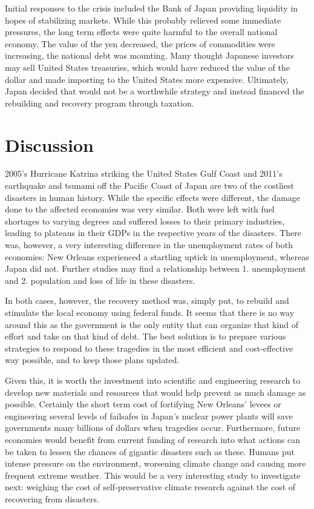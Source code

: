 \documentclass[%
 reprint,
 amsmath,amssymb,
 aps,
]{revtex4-1}
\begin{document}
Initial responses to the crisis included the Bank of Japan providing liquidity in hopes of stabilizing markets. While this probably relieved some immediate pressures, the long term effects were quite harmful to the overall national economy. The value of the yen decreased, the prices of commodities were increasing, the national debt was mounting. Many thought Japanese investors may sell United States treasuries, which would have reduced the value of the dollar and made importing to the United States more expensive. Ultimately, Japan decided that would not be a worthwhile strategy and instead financed the rebuilding and recovery program through taxation. \cite{amadeo_2020}

\section{\label{sec:level1}Discussion}

2005's Hurricane Katrina striking the United States Gulf Coast and 2011's earthquake and tsunami off the Pacific Coast of Japan are two of the costliest disasters in human history. While the specific effects were different, the damage done to the affected economies was very similar. Both were left with fuel shortages to varying degrees and suffered losses to their primary industries, leading to plateaus in their GDPs in the respective years of the disasters. There was, however, a very interesting difference in the unemployment rates of both economies: New Orleans experienced a startling uptick in unemployment, whereas Japan did not. Further studies may find a relationship between 1. unemployment and 2. population and loss of life in these disasters.

In both cases, however, the recovery method was, simply put, to rebuild and stimulate the local economy using federal funds. It seems that there is no way around this as the government is the only entity that can organize that kind of effort and take on that kind of debt. The best solution is to prepare various strategies to respond to these tragedies in the most efficient and cost-effective way possible, and to keep those plans updated.

Given this, it is worth the investment into scientific and engineering research to develop new materials and resources that would help prevent as much damage as possible. Certainly the short term cost of fortifying New Orleans' levees or engineering several levels of failsafes in Japan's nuclear power plants will save governments many billions of dollars when tragedies occur. Furthermore, future economies would benefit from current funding of research into what actions can be taken to lessen the chances of gigantic disasters such as these. Humans put intense pressure on the environment, worsening climate change and causing more frequent extreme weather. This would be a very interesting study to investigate next: weighing the cost of self-preservative climate research against the cost of recovering from disasters.


\end{document}
